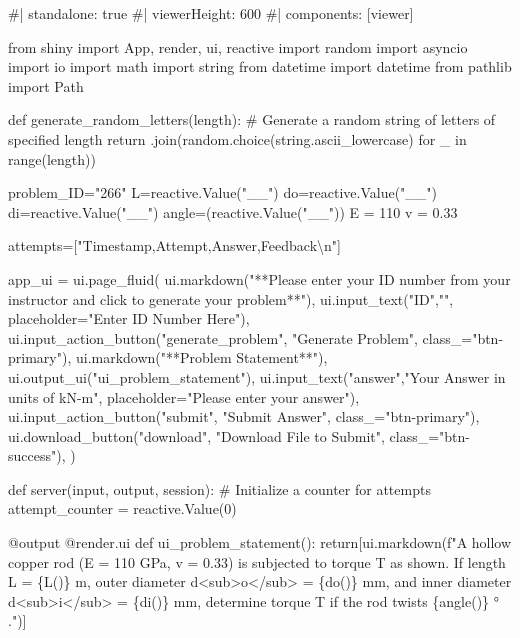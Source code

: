 \documentclass[
  letterpaper,
  DIV=11,
  numbers=noendperiod]{scrreprt}
\newenvironment{Shaded}{\begin{snugshade}}{\end{snugshade}}
\newcommand{\NormalTok}[1]{\textcolor[rgb]{0.00,0.23,0.31}{#1}}
\begin{document}
\begin{Shaded}
\begin{Highlighting}[]
\NormalTok{\#| standalone: true}
\NormalTok{\#| viewerHeight: 600}
\NormalTok{\#| components: [viewer]}

\NormalTok{from shiny import App, render, ui, reactive}
\NormalTok{import random}
\NormalTok{import asyncio}
\NormalTok{import io}
\NormalTok{import math}
\NormalTok{import string}
\NormalTok{from datetime import datetime}
\NormalTok{from pathlib import Path}

\NormalTok{def generate\_random\_letters(length):}
\NormalTok{    \# Generate a random string of letters of specified length}
\NormalTok{    return \textquotesingle{}\textquotesingle{}.join(random.choice(string.ascii\_lowercase) for \_ in range(length)) }

\NormalTok{problem\_ID="266"}
\NormalTok{L=reactive.Value("\_\_")}
\NormalTok{do=reactive.Value("\_\_")}
\NormalTok{di=reactive.Value("\_\_")}
\NormalTok{angle=(reactive.Value("\_\_"))}
\NormalTok{E = 110}
\NormalTok{v = 0.33}


\NormalTok{attempts=["Timestamp,Attempt,Answer,Feedback\textbackslash{}n"]}

\NormalTok{app\_ui = ui.page\_fluid(}
\NormalTok{    ui.markdown("**Please enter your ID number from your instructor and click to generate your problem**"),}
\NormalTok{    ui.input\_text("ID","", placeholder="Enter ID Number Here"),}
\NormalTok{    ui.input\_action\_button("generate\_problem", "Generate Problem", class\_="btn{-}primary"),}
\NormalTok{    ui.markdown("**Problem Statement**"),}
\NormalTok{    ui.output\_ui("ui\_problem\_statement"),}
\NormalTok{    ui.input\_text("answer","Your Answer in units of kN{-}m", placeholder="Please enter your answer"),}
\NormalTok{    ui.input\_action\_button("submit", "Submit Answer", class\_="btn{-}primary"),}
\NormalTok{    ui.download\_button("download", "Download File to Submit", class\_="btn{-}success"),}
\NormalTok{)}


\NormalTok{def server(input, output, session):}
\NormalTok{    \# Initialize a counter for attempts}
\NormalTok{    attempt\_counter = reactive.Value(0)}

\NormalTok{    @output}
\NormalTok{    @render.ui}
\NormalTok{    def ui\_problem\_statement():}
\NormalTok{        return[ui.markdown(f"A hollow copper rod (E = 110 GPa, v = 0.33) is subjected to torque T as shown. If length L = \{L()\} m, outer diameter d\textless{}sub\textgreater{}o\textless{}/sub\textgreater{} = \{do()\} mm, and inner diameter d\textless{}sub\textgreater{}i\textless{}/sub\textgreater{} = \{di()\} mm, determine torque T if the rod twists \{angle()\} ° .")]}
    

\end{Highlighting}
\end{Shaded}
\end{document}
